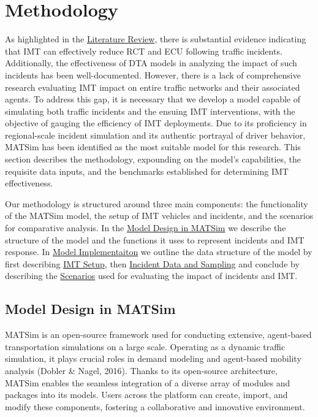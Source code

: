 \documentclass[fancy, oneside, mastersfancy, ms]{byuthesis}
\begin{document}

\hypertarget{sec-methods}{%
\chapter{Methodology}\label{sec-methods}}

As highlighted in the \protect\hyperlink{sec-literature}{Literature
Review}, there is substantial evidence indicating that IMT can
effectively reduce RCT and ECU following traffic incidents.
Additionally, the effectiveness of DTA models in analyzing the impact of
such incidents has been well-documented. However, there is a lack of
comprehensive research evaluating IMT impact on entire traffic networks
and their associated agents. To address this gap, it is necessary that
we develop a model capable of simulating both traffic incidents and the
ensuing IMT interventions, with the objective of gauging the efficiency
of IMT deployments. Due to its proficiency in regional-scale incident
simulation and its authentic portrayal of driver behavior, MATSim has
been identified as the most suitable model for this research. This
section describes the methodology, expounding on the model's
capabilities, the requisite data inputs, and the benchmarks established
for determining IMT effectiveness.

Our methodology is structured around three main components: the
functionality of the MATSim model, the setup of IMT vehicles and
incidents, and the scenarios for comparative analysis. In the
\protect\hyperlink{sec-MATSim_mod}{Model Design in MATSim} we describe
the structure of the model and the functions it uses to represent
incidents and IMT response. In \protect\hyperlink{sec-model_imp}{Model
Implementaiton} we outline the data structure of the model by first
describing \protect\hyperlink{sec-IMT_setup}{IMT Setup}, then
\protect\hyperlink{sec-inc_data}{Incident Data and Sampling} and
conclude by describing the \protect\hyperlink{sec-scenarios}{Scenarios}
used for evaluating the impact of incidents and IMT.

\hypertarget{sec-MATSim_mod}{%
\section{Model Design in MATSim}\label{sec-MATSim_mod}}

MATSim is an open-source framework used for conducting extensive,
agent-based transportation simulations on a large scale. Operating as a
dynamic traffic simulation, it plays crucial roles in demand modeling
and agent-based mobility analysis (Dobler \& Nagel, 2016). Thanks to its
open-source architecture, MATSim enables the seamless integration of a
diverse array of modules and packages into its models. Users across the
platform can create, import, and modify these components, fostering a
collaborative and innovative environment.
\end{document}
